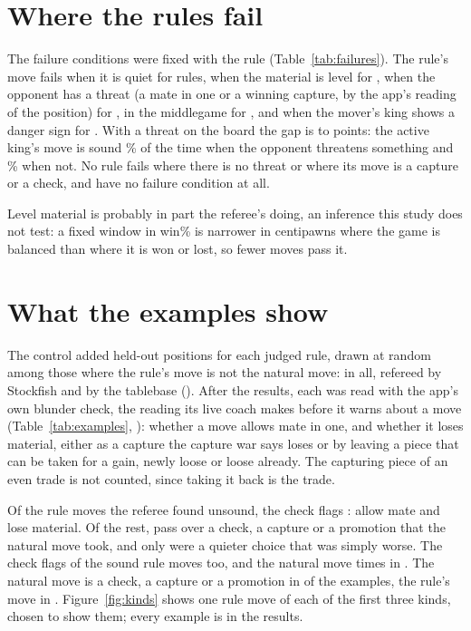 \documentclass[11pt]{article}
\begin{document}
\ControlTable

\section{Where the rules fail}

The failure conditions were fixed with the rule (Table~\ref{tab:failures}). The rule's move fails
when it is quiet for \FailQuiet{} rules, when the material is level for \FailLevel, when the
opponent has a threat (a mate in one or a winning capture, by the app's reading of the position)
for \FailThreat, in the middlegame for \FailMiddle, and when the mover's king shows a danger sign
for \FailDanger. With a threat on the board the gap is \ThreatGapLow{} to \ThreatGapHigh{} points:
the active king's move is sound \AkThreat\% of the time when the opponent threatens something and
\AkNoThreat\% when not. No rule fails where there is no threat or where its move is a capture or a
check, and \NoFailNames{} have no failure condition at all.

Level material is probably in part the referee's doing, an inference this study does not test: a
fixed window in win\% is narrower in centipawns where the game is balanced than where it is won or
lost, so fewer moves pass it.

\FailureTable

\section{What the examples show}

The control added \ExPer{} held-out positions for each judged rule, drawn at random among those
where the rule's move is not the natural move: \ExN{} in all, \ExStockfish{} refereed by Stockfish
and \ExTablebase{} by the tablebase (). After the results, each was read
with the app's own blunder check, the reading its live coach makes before it warns about a move
(Table~\ref{tab:examples}, ): whether a move allows mate in one, and whether it
loses material, either as a capture the capture war says loses or by leaving a piece that can be
taken for a gain, newly loose or loose already. The capturing piece of an even trade is not counted,
since taking it back is the trade.

Of the \ExUnsound{} rule moves the referee found unsound, the check flags \ExCaught: \ExMate{} allow
mate and \ExLoses{} lose material. Of the rest, \ExForcing{} pass over a check, a capture or a
promotion that the natural move took, and only \ExQuiet{} were a quieter choice that was simply
worse. The check flags \ExSoundFlagged{} of the \ExSound{} sound rule moves too, and the natural move
\ExNFlagged{} times in \ExN. The natural move is a check, a capture or a promotion in \ExNForcing{}
of the examples, the rule's move in \ExRForcing. Figure~\ref{fig:kinds} shows one rule move of each
of the first three kinds, chosen to show them; every example is in the results.
\end{document}
